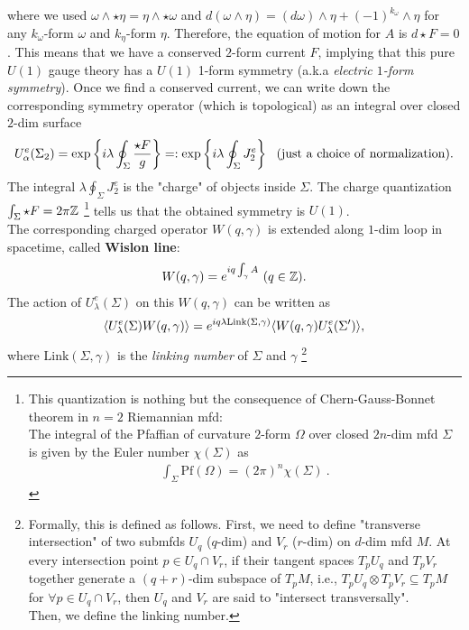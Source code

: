\documentclass{ltjsarticle}
\theoremstyle{mystyle} %
\numberwithin{equation}{section}
\begin{document}
where we used $\omega\wedge \star \eta = \eta\wedge \star \omega$ and 
$d(\omega\wedge \eta) = (d\omega)\wedge \eta + (-1)^{k_\omega} \wedge \eta$ for 
any $k_\omega$-form $\omega$ and $k_\eta$-form $\eta$. 
Therefore, the equation of motion for $A$ is $d\star F=0$. 
This means that we have a conserved $2$-form current $F$, implying that this pure $U(1)$ gauge theory has a $U(1)$ 1-form symmetry (a.k.a \textit{electric $1$-form symmetry}). 
Once we find a conserved current, we can write down the corresponding symmetry operator (which is topological) as an integral over closed $2$-dim surface
\begin{align}
    U^{e}_{\alpha}(\Sigma_2) = \exp\left\{{i\lambda\oint_{\Sigma}\frac{\star F}{g}}\right\}=: \exp\left\{{i\lambda\oint_{\Sigma}J^e_2}\right\} ~~
    (\mathrm{just~a~choice~of~normalization}). 
\end{align}
The integral $\lambda\oint_{\Sigma}J^e_2$ is the "charge" of objects inside $\Sigma$. 
The charge quantization $\int_{\Sigma} \star F = 2\pi \mathbb{Z}$
\footnote{This quantization is nothing but the consequence of Chern-Gauss-Bonnet theorem in $n=2$ Riemannian mfd: \\
The integral of the Pfaffian of curvature $2$-form $\Omega$ over closed $2n$-dim mfd $\Sigma$ is given by the Euler number $\chi(\Sigma)$ as 
\begin{align}
    \int_{\Sigma} \mathrm{Pf}(\Omega) = (2\pi)^n \chi(\Sigma)~. 
\end{align}}
 tells us that the obtained symmetry is $U(1)$. \\
  The corresponding charged operator $W(q, \gamma)$ is extended along $1$-dim loop in spacetime, called \textbf{Wislon line}: 
  \begin{align}
    W(q, \gamma)=e^{iq\int_{\gamma}A}~(q\in \mathbb{Z}). 
  \end{align}
  The action of $U^{e}_\lambda(\Sigma)$ on this $W(q, \gamma)$ can be written as
  \begin{align}
    \langle{U^e_{\lambda}(\Sigma)W(q, \gamma)}\rangle=e^{iq\lambda\mathrm{Link}(\Sigma, \gamma)}\langle{W(q, \gamma)U^e_{\lambda}(\Sigma')}\rangle,  
  \end{align}
  where $\mathrm{Link}(\Sigma, \gamma)$ is the \textit{linking number} of $\Sigma$ and $\gamma$
  \footnote{Formally, this is defined as follows. 
  First, we need to define "transverse intersection" of two submfds $U_q$ ($q$-dim) and $V_r$ ($r$-dim) on $d$-dim mfd $M$. 
  At every intersection point $p\in U_{q}\cap V_r$, if 
  their tangent spaces $T_p U_q$ and $T_p V_r$ together generate a $(q+r)$-dim subspace of $T_pM$, i.e., 
  $T_p U_q \otimes T_p V_r \subseteq T_p M$ for $\forall p\in U_{q}\cap V_r$, then 
  $U_q$ and $V_r$ are said to "intersect transversally". \\
   Then, we define the linking number. }
\end{document}
